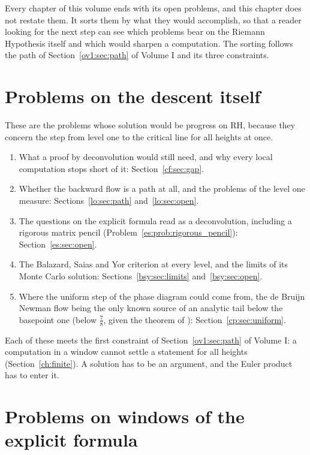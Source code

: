 
Every chapter of this volume ends with its open problems, and this chapter does not restate them. It sorts them by what they would accomplish, so that a reader looking for the next step can see which problems bear on the Riemann Hypothesis itself and which would sharpen a computation. The sorting follows the path of Section~\ref{ov1:sec:path} of Volume I and its three constraints.

\section{Problems on the descent itself}\label{ov2:sec:descent}

These are the problems whose solution would be progress on RH, because they concern the step from level one to the critical line for all heights at once.
\begin{enumerate}
\item What a proof by deconvolution would still need, and why every local computation stops short of it: Section~\ref{cf:sec:gap}.
\item Whether the backward flow is a path at all, and the problems of the level one measure: Sections~\ref{lo:sec:path} and~\ref{lo:sec:open}.
\item The questions on the explicit formula read as a deconvolution, including a rigorous matrix pencil (Problem~\ref{es:prob:rigorous_pencil}): Section~\ref{es:sec:open}.
\item The Balazard, Saias and Yor criterion at every level, and the limits of its Monte Carlo solution: Sections~\ref{bsy:sec:limits} and~\ref{bsy:sec:open}.
\item Where the uniform step of the phase diagram could come from, the de Bruijn Newman flow being the only known source of an analytic tail below the basepoint one (below $\frac78$, given the theorem of \cite{OAI26a}): Section~\ref{cp:sec:uniform}.
\end{enumerate}
Each of these meets the first constraint of Section~\ref{ov1:sec:path} of Volume I: a computation in a window cannot settle a statement for all heights (Section~\ref{ch:finite}). A solution has to be an argument, and the Euler product has to enter it.

\section{Problems on windows of the explicit formula}\label{ov2:sec:windows}

